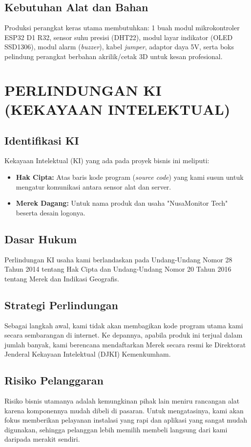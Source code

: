 \documentclass[12pt, a4paper]{article}
\begin{document}
\subsection{Kebutuhan Alat dan Bahan}
Produksi perangkat keras utama membutuhkan: 1 buah modul mikrokontroler ESP32 D1 R32, sensor suhu presisi (DHT22), modul layar indikator (OLED SSD1306), modul alarm (\textit{buzzer}), kabel \textit{jumper}, adaptor daya 5V, serta boks pelindung perangkat berbahan akrilik/cetak 3D untuk kesan profesional.

\section{PERLINDUNGAN KI (KEKAYAAN INTELEKTUAL)}

\subsection{Identifikasi KI}
Kekayaan Intelektual (KI) yang ada pada proyek bisnis ini meliputi:
\begin{itemize}
    \item \textbf{Hak Cipta:} Atas baris kode program (\textit{source code}) yang kami susun untuk mengatur komunikasi antara sensor alat dan server.
    \item \textbf{Merek Dagang:} Untuk nama produk dan usaha "NusaMonitor Tech" beserta desain logonya.
\end{itemize}

\subsection{Dasar Hukum}
Perlindungan KI usaha kami berlandaskan pada Undang-Undang Nomor 28 Tahun 2014 tentang Hak Cipta dan Undang-Undang Nomor 20 Tahun 2016 tentang Merek dan Indikasi Geografis.

\subsection{Strategi Perlindungan}
Sebagai langkah awal, kami tidak akan membagikan kode program utama kami secara sembarangan di internet. Ke depannya, apabila produk ini terjual dalam jumlah banyak, kami berencana mendaftarkan Merek secara resmi ke Direktorat Jenderal Kekayaan Intelektual (DJKI) Kemenkumham.

\subsection{Risiko Pelanggaran}
Risiko bisnis utamanya adalah kemungkinan pihak lain meniru rancangan alat karena komponennya mudah dibeli di pasaran. Untuk mengatasinya, kami akan fokus memberikan pelayanan instalasi yang rapi dan aplikasi yang sangat mudah digunakan, sehingga pelanggan lebih memilih membeli langsung dari kami daripada merakit sendiri.
\end{document}
